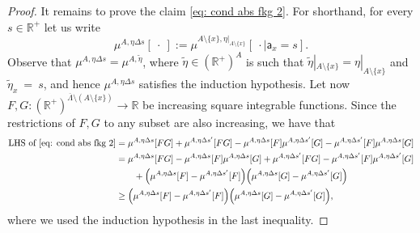 \documentclass[11pt,a4paper]{article}
\theoremstyle{definition}
\numberwithin{equation}{section}
\begin{document}
\begin{proof}
It remains to prove the claim \eqref{eq: cond abs fkg 2}. For shorthand, for every $s \in \mathbb R^+$ let us write
\begin{equation}
    \mu^{A, \eta \Delta s}[\:\cdot\:]:= \mu^{A\setminus \{x\}, \eta|_{A\setminus \{x\}}}[\:\cdot \mid \mathsf a_x=s].
\end{equation}
Observe that $\mu^{A, \eta\Delta s}=\mu^{A,\tilde\eta}$, where $\tilde \eta \in (\mathbb R^+)^A$ is such that $\tilde\eta|_{A \setminus \{x\}} = \eta|_{A \setminus \{x\}}$ and $\tilde\eta_x~=~s$, and hence $\mu^{A,\eta\Delta s}$ satisfies the induction hypothesis. Let now $F,G:(\mathbb R^+)^{\overline{\Lambda} \setminus (A\setminus \{x\})}\rightarrow \mathbb R$ be increasing square integrable functions. Since the restrictions of $F,G$ to any subset are also increasing, we have that
\begin{align}\label{eq: cond abs fkg 3}
\begin{split}
\text{LHS of }\eqref{eq: cond abs fkg 2}
&=	
\mu^{A,\eta\Delta s}[FG] + \mu^{A,\eta\Delta s'}[FG]- \mu^{A,\eta\Delta s}[F]\mu^{A,\eta\Delta s'}[G]
- \mu^{A,\eta\Delta s'}[F]\mu^{A,\eta\Delta s}[G]
\\
&=
\mu^{A,\eta
\Delta s}[FG] - \mu^{A,\eta\Delta s}[F]\mu^{A,\eta\Delta s}[G]+\mu^{A,\eta \Delta s'}[FG] - \mu^{A,\eta\Delta s'}[F]\mu^{A,\eta\Delta s'}[G]
\\
&\quad\quad
+
\Big(\mu^{A,\eta\Delta s}[F]-\mu^{A,\eta\Delta s'}[F]\Big)\Big(\mu^{A,\eta\Delta s}[G]-\mu^{A,\eta\Delta s'}[G]\Big)
\\
&\geq
\Big(\mu^{A,\eta\Delta s}[F]-\mu^{A,\eta\Delta s'}[F]\Big)\Big(\mu^{A,\eta\Delta s}[G]-\mu^{A,\eta\Delta s'}[G]\Big),
\end{split}
\end{align}
where we used the induction hypothesis in the last inequality.


\end{proof}
\end{document}

